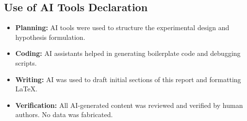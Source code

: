 
\subsection*{Use of AI Tools Declaration}
\begin{itemize}
    \item \textbf{Planning:} AI tools were used to structure the experimental design and hypothesis formulation.
    \item \textbf{Coding:} AI assistants helped in generating boilerplate code and debugging scripts.
    \item \textbf{Writing:} AI was used to draft initial sections of this report and formatting LaTeX.
    \item \textbf{Verification:} All AI-generated content was reviewed and verified by human authors. No data was fabricated.
\end{itemize}
